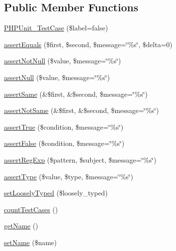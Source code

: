 \subsection*{Public Member Functions}
\begin{DoxyCompactItemize}
\item 
\hyperlink{class_p_h_p_unit___test_case_aa9026b99fa5faf9174a845db4c65f7d7}{PHPUnit\_\-TestCase} (\$label=false)
\item 
\hyperlink{class_p_h_p_unit___test_case_ae27941be41c5131649e79cb0809d742d}{assertEquals} (\$first, \$second, \$message=\char`\"{}\%s\char`\"{}, \$delta=0)
\item 
\hyperlink{class_p_h_p_unit___test_case_a9b906d5a1b0f27570f1c396e2a5a99e9}{assertNotNull} (\$value, \$message=\char`\"{}\%s\char`\"{})
\item 
\hyperlink{class_p_h_p_unit___test_case_ad8562d55d3341b088a6d90d38c1024e9}{assertNull} (\$value, \$message=\char`\"{}\%s\char`\"{})
\item 
\hyperlink{class_p_h_p_unit___test_case_a707c89ec40005bbf0cd002509c276ab2}{assertSame} (\&\$first, \&\$second, \$message=\char`\"{}\%s\char`\"{})
\item 
\hyperlink{class_p_h_p_unit___test_case_ad616a8e124f71e003fdee1c484a5910f}{assertNotSame} (\&\$first, \&\$second, \$message=\char`\"{}\%s\char`\"{})
\item 
\hyperlink{class_p_h_p_unit___test_case_a79026299eab938527a32d85e33f331fa}{assertTrue} (\$condition, \$message=\char`\"{}\%s\char`\"{})
\item 
\hyperlink{class_p_h_p_unit___test_case_a02877e6baddfe151e45b3fbde0697a63}{assertFalse} (\$condition, \$message=\char`\"{}\%s\char`\"{})
\item 
\hyperlink{class_p_h_p_unit___test_case_a2b02612d6eae4fc5ff14621019fff7e5}{assertRegExp} (\$pattern, \$subject, \$message=\char`\"{}\%s\char`\"{})
\item 
\hyperlink{class_p_h_p_unit___test_case_abe8fbcd84601418096c442315d165c81}{assertType} (\$value, \$type, \$message=\char`\"{}\%s\char`\"{})
\item 
\hyperlink{class_p_h_p_unit___test_case_aa23d060b8bc5da84ca3e76ba7d41f64b}{setLooselyTyped} (\$loosely\_\-typed)
\item 
\hyperlink{class_p_h_p_unit___test_case_a4d4116898093e6b3985a8f99f95d2296}{countTestCases} ()
\item 
\hyperlink{class_p_h_p_unit___test_case_a5993676a471e992b22614d43d46d2829}{getName} ()
\item 
\hyperlink{class_p_h_p_unit___test_case_a976c20907e244e08e662e51428534171}{setName} (\$name)
\end{DoxyCompactItemize}
